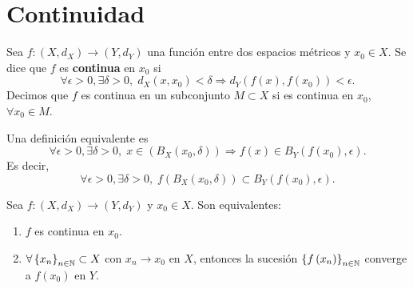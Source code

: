 \chapter{Continuidad}
\begin{definition}[Continuidad]
Sea $\displaystyle f : \left(X,d _{X}\right) \to \left(Y, d _{Y}\right) $ una función entre dos espacios métricos y $\displaystyle x_{0} \in X $. Se dice que $\displaystyle f $ es \textbf{continua} en $\displaystyle x_{0} $ si 
\[\forall \epsilon > 0, \exists \delta > 0, \; d _{X}\left(x,x_{0}\right) < \delta \Rightarrow d _{Y}\left(f\left(x\right), f\left(x_{0}\right)\right) < \epsilon .\]
Decimos que $\displaystyle f $ es continua en un subconjunto $\displaystyle M \subset X $ si es continua en $\displaystyle x_{0} $, $\displaystyle \forall x_{0} \in M $.
\end{definition}
\begin{observation}
Una definición equivalente es
\[\forall \epsilon > 0, \exists \delta > 0, \; x \in \left(B_{X}\left(x_{0}, \delta \right)\right) \Rightarrow f\left(x\right) \in B _{Y}\left(f\left(x_{0}\right), \epsilon \right) .\]
Es decir, 
\[\forall \epsilon > 0, \exists \delta > 0, \; f\left(B_{X}\left(x_{0}, \delta \right)\right) \subset B_{Y}\left(f\left(x_{0}\right), \epsilon \right) .\]
\end{observation}
\begin{prop}
Sea $\displaystyle f : \left(X, d _{X}\right) \to \left(Y, d _{Y}\right) $ y $\displaystyle x_{0} \in X $. Son equivalentes:
\begin{enumerate}
\item $\displaystyle f $ es continua en $\displaystyle x_{0} $.
\item $\displaystyle \forall \left\{ x_{n}\right\} _{n\in\mathbb{N}}\subset X $ con $\displaystyle x_{n} \to x_{0} $ en $\displaystyle X $, entonces la sucesión $\displaystyle \left\{ f\left(x_{n}\right)\right\} _{n\in\mathbb{N}} $ converge a $\displaystyle f\left(x_{0}\right) $ en $\displaystyle Y $.
\end{enumerate}
\end{prop}
